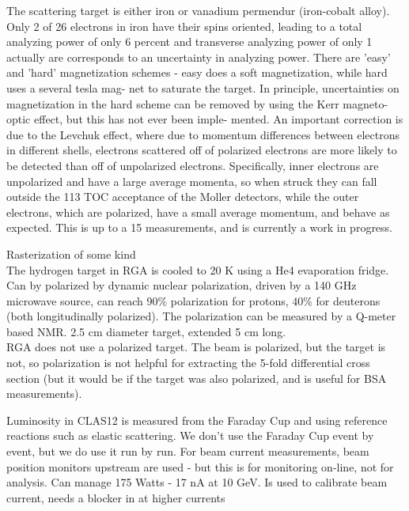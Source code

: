            The scattering target is either iron or vanadium permendur (iron-cobalt alloy). Only 2 of
            26 electrons in iron have their spins oriented, leading to a total analyzing power of only 6 percent
            and transverse analyzing power of only 1%
            actually are corresponds to an uncertainty in analyzing power. There are ’easy’ and ’hard’
            magnetization schemes - easy does a soft magnetization, while hard uses a several tesla mag-
            net to saturate the target. In principle, uncertainties on magnetization in the hard scheme
            can be removed by using the Kerr magneto-optic effect, but this has not ever been imple-
            mented. An important correction is due to the Levchuk effect, where due to momentum
            differences between electrons in different shells, electrons scattered off of polarized electrons
            are more likely to be detected than off of unpolarized electrons. Specifically, inner electrons
            are unpolarized and have a large average momenta, so when struck they can fall outside the
            113 TOC
            acceptance of the Moller detectors, while the outer electrons, which are polarized, have a
            small average momentum, and behave as expected. This is up to a 15%
            measurements, and is currently a work in progress.


            

             Rasterization of some kind
                \\
                \indent The hydrogen target in RGA is cooled to 20 K using a He4 evaporation fridge. Can by polarized by dynamic nuclear polarization, driven by a 140 GHz microwave source, can reach 90\% polarization for protons, 40\% for deuterons (both longitudinally polarized). The polarization can be measured by a Q-meter based NMR. 2.5 cm diameter target, extended 5 cm long. \\
                \indent RGA does not use a polarized target. The beam is polarized, but the target is not, so polarization is not helpful for extracting the 5-fold differential cross section (but it would be if the target was also polarized, and is useful for BSA measurements).
            
   
            Luminosity in CLAS12 is measured from the Faraday Cup and using reference reactions such as elastic scattering. We don't use the Faraday Cup event by event, but we do use it run by run. For beam current measurements, beam position monitors upstream are used - but this is for monitoring on-line, not for analysis.
                       Can manage 175 Watts - 17 nA at 10 GeV. Is used to calibrate beam current, needs a blocker in at higher currents
                       